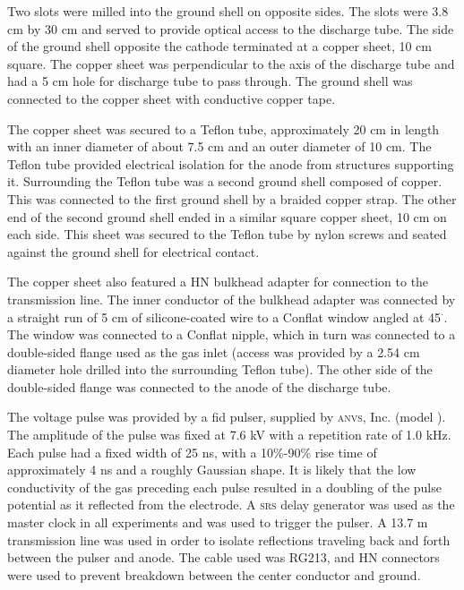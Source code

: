 Two slots were milled into the ground shell on opposite sides. The slots were
3.8 cm by 30 cm and served to provide optical access to the discharge tube. The
side of the ground shell opposite the cathode terminated at a copper sheet, 10
cm square. The copper sheet was perpendicular to the axis of the discharge tube
and had a 5 cm hole for discharge tube to pass through. The ground shell was
connected to the copper sheet with conductive copper tape.

The copper sheet was secured to a Teflon tube, approximately 20 cm in length
with an inner diameter of about 7.5 cm and an outer diameter of 10 cm. The
Teflon tube provided electrical isolation for the anode from structures
supporting it. Surrounding the Teflon tube was a second ground shell composed of
copper. This was connected to the first ground shell by a braided copper strap.
The other end of the second ground shell ended in a similar square copper sheet,
10 cm on each side. This sheet was secured to the Teflon tube by nylon screws
and seated against the ground shell for electrical contact.

The copper sheet also featured a HN bulkhead adapter for connection to the
transmission line. The inner conductor of the bulkhead adapter was connected by
a straight run of 5 cm of silicone-coated wire to a Conflat window angled at
45$^\cdot$. The window was connected to a Conflat nipple, which in turn was
connected to a double-sided flange used as the gas inlet (access was provided by
a 2.54 cm diameter hole drilled into the surrounding Teflon tube). The other
side of the double-sided flange was connected to the anode of the discharge
tube.

The voltage pulse was provided by a \acs{fid} pulser, supplied by \textsc{anvs},
Inc. (model ). The amplitude of the pulse was fixed at 7.6 kV
with a repetition rate of 1.0 kHz. Each pulse had a fixed width of 25 ns, with a
10\%-90\% rise time of approximately 4 ns and a roughly Gaussian shape. It is
likely that the low conductivity of the gas preceding each pulse resulted in a
doubling of the pulse potential as it reflected from the electrode. A
\textsc{srs}  delay generator was used as the master clock in all
experiments and was used to trigger the pulser. A 13.7 m transmission line was
used in order to isolate reflections traveling back and forth between the pulser
and anode. The cable used was RG213, and HN connectors were used to prevent
breakdown between the center conductor and ground.

